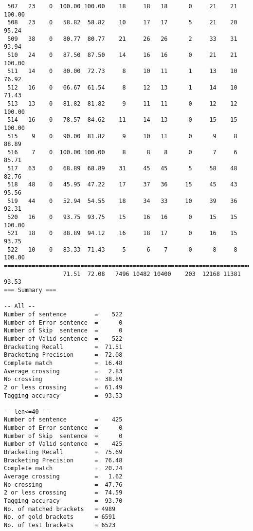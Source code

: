 \begin{verbatim}
 507   23    0  100.00 100.00    18     18   18      0     21    21   100.00
 508   23    0   58.82  58.82    10     17   17      5     21    20    95.24
 509   38    0   80.77  80.77    21     26   26      2     33    31    93.94
 510   24    0   87.50  87.50    14     16   16      0     21    21   100.00
 511   14    0   80.00  72.73     8     10   11      1     13    10    76.92
 512   16    0   66.67  61.54     8     12   13      1     14    10    71.43
 513   13    0   81.82  81.82     9     11   11      0     12    12   100.00
 514   16    0   78.57  84.62    11     14   13      0     15    15   100.00
 515    9    0   90.00  81.82     9     10   11      0      9     8    88.89
 516    7    0  100.00 100.00     8      8    8      0      7     6    85.71
 517   63    0   68.89  68.89    31     45   45      5     58    48    82.76
 518   48    0   45.95  47.22    17     37   36     15     45    43    95.56
 519   44    0   52.94  54.55    18     34   33     10     39    36    92.31
 520   16    0   93.75  93.75    15     16   16      0     15    15   100.00
 521   18    0   88.89  94.12    16     18   17      0     16    15    93.75
 522   10    0   83.33  71.43     5      6    7      0      8     8   100.00
============================================================================
                 71.51  72.08   7496 10482 10400    203  12168 11381    93.53
=== Summary ===

-- All --
Number of sentence        =    522
Number of Error sentence  =      0
Number of Skip  sentence  =      0
Number of Valid sentence  =    522
Bracketing Recall         =  71.51
Bracketing Precision      =  72.08
Complete match            =  16.48
Average crossing          =   2.83
No crossing               =  38.89
2 or less crossing        =  61.49
Tagging accuracy          =  93.53

-- len<=40 --
Number of sentence        =    425
Number of Error sentence  =      0
Number of Skip  sentence  =      0
Number of Valid sentence  =    425
Bracketing Recall         =  75.69
Bracketing Precision      =  76.48
Complete match            =  20.24
Average crossing          =   1.62
No crossing               =  47.76
2 or less crossing        =  74.59
Tagging accuracy          =  93.70
No. of matched brackets   = 4989
No. of gold brackets      = 6591
No. of test brackets      = 6523

\end{verbatim}

\normalsize

